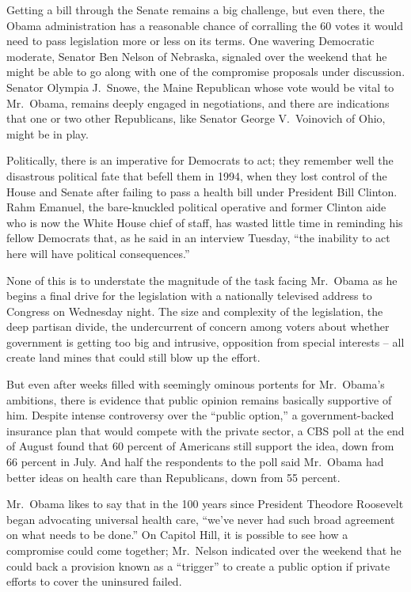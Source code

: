 ﻿\documentclass[12pt]{article}
\begin{document}
Getting a bill through the Senate remains a big challenge, but even there, the Obama administration
has a reasonable chance of corralling the 60 votes it would need to pass legislation more or less on
its terms. One wavering Democratic moderate, Senator Ben Nelson of Nebraska, signaled over the
weekend that he might be able to go along with one of the compromise proposals under discussion.
Senator Olympia J.~Snowe, the Maine Republican whose vote would be vital to Mr.~Obama, remains
deeply engaged in negotiations, and there are indications that one or two other Republicans, like
Senator George V.~Voinovich of Ohio, might be in play.

Politically, there is an imperative for Democrats to act; they remember well the disastrous
political fate that befell them in 1994, when they lost control of the House and Senate after
failing to pass a health bill under President Bill Clinton. Rahm Emanuel, the bare-knuckled
political operative and former Clinton aide who is now the White House chief of staff, has wasted
little time in reminding his fellow Democrats that, as he said in an interview Tuesday, ``the
inability to act here will have political consequences.''

None of this is to understate the magnitude of the task facing Mr.~Obama as he begins a final drive
for the legislation with a nationally televised address to Congress on Wednesday night. The size and
complexity of the legislation, the deep partisan divide, the undercurrent of concern among voters
about whether government is getting too big and intrusive, opposition from special interests -- all
create land mines that could still blow up the effort.

But even after weeks filled with seemingly ominous portents for Mr.~Obama's ambitions, there is
evidence that public opinion remains basically supportive of him. Despite intense controversy over
the ``public option,'' a government-backed insurance plan that would compete with the private
sector, a CBS poll at the end of August found that 60 percent of Americans still support the idea,
down from 66 percent in July. And half the respondents to the poll said Mr.~Obama had better ideas
on health care than Republicans, down from 55 percent.

Mr.~Obama likes to say that in the 100 years since President Theodore Roosevelt began advocating
universal health care, ``we've never had such broad agreement on what needs to be done.'' On Capitol
Hill, it is possible to see how a compromise could come together; Mr.~Nelson indicated over the
weekend that he could back a provision known as a ``trigger'' to create a public option if private
efforts to cover the uninsured failed.
\end{document}
